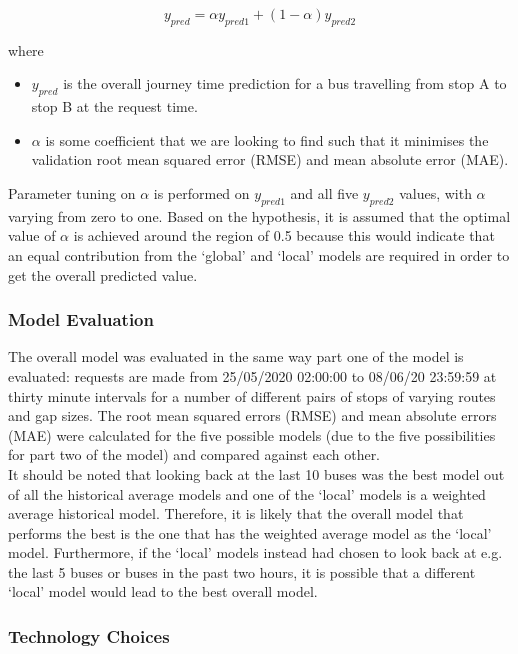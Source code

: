 \begin{equation}
\label{eq:regression-overall}
    y_{pred} = \alpha y_{pred1} + (1 - \alpha)y_{pred2}
\end{equation}

where 
\begin{itemize}
    \item $y_{pred}$ is the overall journey time prediction for a bus travelling from stop A to stop B at the request time.
    \item $\alpha$ is some coefficient that we are looking to find such that it minimises the validation root mean squared error (RMSE) and mean absolute error (MAE). 
\end{itemize}

Parameter tuning on $\alpha$ is performed on $y_{pred1}$ and all five $y_{pred2}$ values, with $\alpha$ varying from zero to one. Based on the hypothesis, it is assumed that the optimal value of $\alpha$ is achieved around the region of 0.5 because this would indicate that an equal contribution from the `global' and `local' models are required in order to get the overall predicted value.

\subsubsection{Model Evaluation}

The overall model was evaluated in the same way part one of the model is evaluated: requests are made from 25/05/2020 02:00:00 to 08/06/20 23:59:59 at thirty minute intervals for a number of different pairs of stops of varying routes and gap sizes. The root mean squared errors (RMSE) and mean absolute errors (MAE) were calculated for the five possible models (due to the five possibilities for part two of the model) and compared against each other. \\

It should be noted that looking back at the last 10 buses was the best model out of all the historical average models and one of the `local' models is a weighted average historical model. Therefore, it is likely that the overall model that performs the best is the one that has the weighted average model as the `local' model. Furthermore, if the `local' models instead had chosen to look back at e.g. the last 5 buses or buses in the past two hours, it is possible that a different `local' model would lead to the best overall model.

\subsubsection{Technology Choices}

